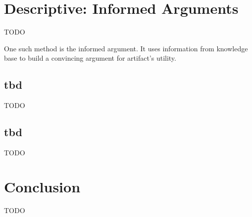 
\section{Descriptive: Informed Arguments}

TODO



One such method is the informed argument. It uses information from knowledge base to build a convincing argument for artifact’s utility.
\cite{Hevner2010}



\subsection{tbd}

TODO





\subsection{tbd}

TODO





\section{Conclusion}

TODO





